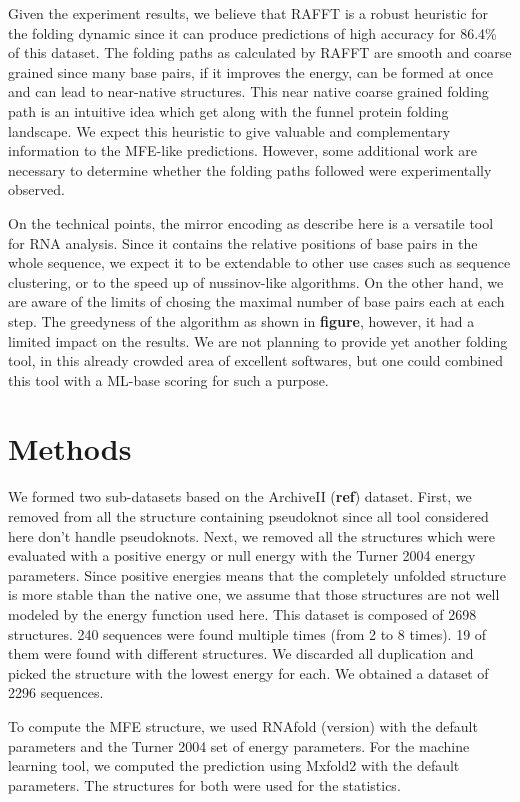 \documentclass[a4paper,12pt]{article}
\begin{document}
{{Given the experiment results, we believe that RAFFT is a robust heuristic for
the folding dynamic since it can produce predictions of high accuracy for 86.4\%
of this dataset. The folding paths as calculated by RAFFT are smooth and coarse
grained since many base pairs, if it improves the energy, can be formed at once
and can lead to near-native structures. This near native coarse grained folding
path is an intuitive idea which get along with the funnel protein folding
landscape. We expect this heuristic to give valuable and complementary
information to the MFE-like predictions. However, some additional work are
necessary to determine whether the folding paths followed were experimentally
observed.

On the technical points, the mirror encoding as describe here is a versatile
tool for RNA analysis. Since it contains the relative positions of base pairs in
the whole sequence, we expect it to be extendable to other use cases such as
sequence clustering, or to the speed up of nussinov-like algorithms. On the
other hand, we are aware of the limits of chosing the maximal number of base
pairs each at each step. The greedyness of the algorithm as shown in \textbf{figure},
however, it had a limited impact on the results. We are not planning to provide
yet another folding tool, in this already crowded area of excellent softwares,
but one could combined this tool with a ML-base scoring for such a purpose.
\section{Methods}
\label{sec:orgea34db3}
We formed two sub-datasets based on the ArchiveII (\textbf{ref}) dataset. First, we
removed from all the structure containing pseudoknot since all tool considered
here don't handle pseudoknots. Next, we removed all the structures which were
evaluated with a positive energy or null energy with the Turner 2004 energy
parameters. Since positive energies means that the completely unfolded structure
is more stable than the native one, we assume that those structures are not well
modeled by the energy function used here. This dataset is composed of 2698
structures. 240 sequences were found multiple times (from 2 to 8 times). 19 of
them were found with different structures. We discarded all duplication and
picked the structure with the lowest energy for each. We obtained a dataset of
2296 sequences.

To compute the MFE structure, we used RNAfold (version) with the default
parameters and the Turner 2004 set of energy parameters. For the machine
learning tool, we computed the prediction using Mxfold2 with the default
parameters. The structures for both were used for the statistics.

}}
\end{document}
